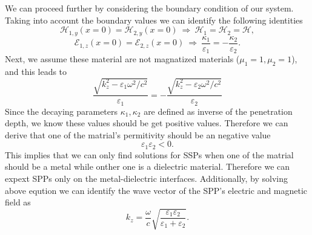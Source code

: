 \documentclass[a4paper]{article}
\numberwithin{equation}{subsection}
\numberwithin{equation}{section}
\begin{document}
We can proceed further by considering the boundary condition of our system. Taking into account the boundary values we can identify the following identities
\begin{equation}
  {\mathcal{H}_{1,y}}(x =0) =  {\mathcal{H}_{2,y}}(x=0) ~\Longrightarrow~
  {\mathcal{H}_{1}} = {\mathcal{H}_{2}} = {\mathcal{H}},
\end{equation}
\begin{equation}
  {\mathcal{E}_{1,z}}(x =0) =  {\mathcal{E}_{2,z}}(x=0) ~\Longrightarrow~
  \frac{\kappa_1}{\varepsilon_1} = - \frac{\kappa_2}{\varepsilon_2}.
\end{equation}
Next, we assume these material are not magnatized materials ($\mu_1 =1,\mu_2 =1$), and this leads to
\begin{equation}
  \frac{\sqrt{k_z^2 - \varepsilon_1 {\omega^2}/{c^2}}}{\varepsilon_1} = - \frac{\sqrt{k_z^2 - \varepsilon_2 {\omega^2}/{c^2}}}{\varepsilon_2}
\end{equation}
Since the decaying parameters $\kappa_1,\kappa_2$ are defined as inverse of the penetration depth, we know these values should be get positive values. Therefore we can derive that one of the matrial's permitivity should be an negative value
\begin{equation}
  \varepsilon_1 \varepsilon_2 < 0.
\end{equation}
This implies that we can only find solutions for SSPs when one of the matrial should be a metal while onther one is a dielectric material. Therefore we can expext SPPs only on the metal-dielectric interfaces. Additionally, by solving above eqution we can identify the wave vector of the SPP's electric and magnetic field as
\begin{equation}
  k_z = \frac{\omega}{c} \sqrt{\frac{\varepsilon_1\varepsilon_2}{\varepsilon_1 + \varepsilon_2}}.
\end{equation}
\end{document}
